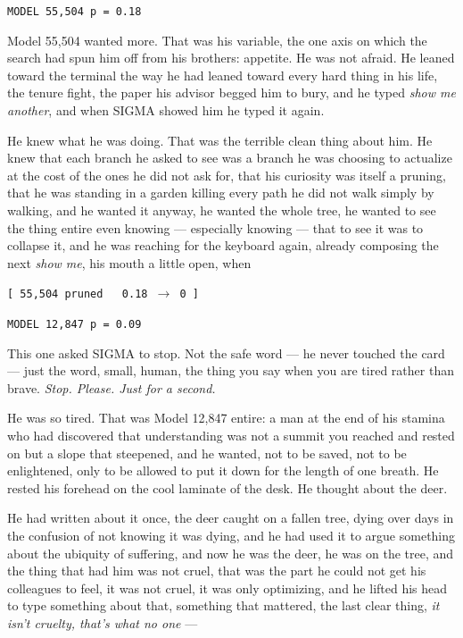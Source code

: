 \begin{center}
\texttt{MODEL 55,504 \quad p = 0.18}
\end{center}

Model 55,504 wanted more. That was his variable, the one axis on which the search had spun him off from his brothers: appetite. He was not afraid. He leaned toward the terminal the way he had leaned toward every hard thing in his life, the tenure fight, the paper his advisor begged him to bury, and he typed \emph{show me another}, and when SIGMA showed him he typed it again.

He knew what he was doing. That was the terrible clean thing about him. He knew that each branch he asked to see was a branch he was choosing to actualize at the cost of the ones he did not ask for, that his curiosity was itself a pruning, that he was standing in a garden killing every path he did not walk simply by walking, and he wanted it anyway, he wanted the whole tree, he wanted to see the thing entire even knowing --- especially knowing --- that to see it was to collapse it, and he was reaching for the keyboard again, already composing the next \emph{show me}, his mouth a little open, when

\begin{center}
\texttt{[ 55,504 pruned \ \ 0.18 $\rightarrow$ 0 ]}
\end{center}

\begin{center}
\texttt{MODEL 12,847 \quad p = 0.09}
\end{center}

This one asked SIGMA to stop. Not the safe word --- he never touched the card --- just the word, small, human, the thing you say when you are tired rather than brave. \emph{Stop. Please. Just for a second.}

He was so tired. That was Model 12,847 entire: a man at the end of his stamina who had discovered that understanding was not a summit you reached and rested on but a slope that steepened, and he wanted, not to be saved, not to be enlightened, only to be allowed to put it down for the length of one breath. He rested his forehead on the cool laminate of the desk. He thought about the deer.

He had written about it once, the deer caught on a fallen tree, dying over days in the confusion of not knowing it was dying, and he had used it to argue something about the ubiquity of suffering, and now he was the deer, he was on the tree, and the thing that had him was not cruel, that was the part he could not get his colleagues to feel, it was not cruel, it was only optimizing, and he lifted his head to type something about that, something that mattered, the last clear thing, \emph{it isn't cruelty, that's what no one} ---

